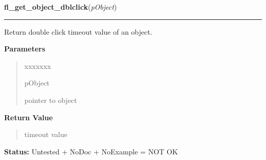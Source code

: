 \hspace{.8\funcindent}\begin{boxedminipage}{\funcwidth}

    \raggedright \textbf{fl\_get\_object\_dblclick}(\textit{pObject})

    \vspace{-1.5ex}

    \rule{\textwidth}{0.5\fboxrule}
\setlength{\parskip}{2ex}
    Return double click timeout value of an object.

\setlength{\parskip}{1ex}
      \textbf{Parameters}
      \vspace{-1ex}

      \begin{quote}
        \begin{Ventry}{xxxxxxx}

          \item[pObject]

          pointer to object

        \end{Ventry}

      \end{quote}

      \textbf{Return Value}
    \vspace{-1ex}

      \begin{quote}
      timeout value

      \end{quote}

\textbf{Status:} Untested + NoDoc + NoExample = NOT OK



    \end{boxedminipage}

    \label{xformslib:library:fl_set_object_geometry}

    \vspace{0.5ex}

